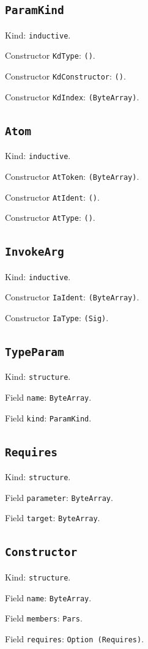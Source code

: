 \documentclass[11pt]{article}
\begin{document}
\subsection*{\texttt{ParamKind}}
\noindent Kind: \texttt{inductive}.\par
\noindent Constructor \texttt{KdType}: \texttt{()}.\par
\noindent Constructor \texttt{KdConstructor}: \texttt{()}.\par
\noindent Constructor \texttt{KdIndex}: \texttt{(ByteArray)}.\par
\subsection*{\texttt{Atom}}
\noindent Kind: \texttt{inductive}.\par
\noindent Constructor \texttt{AtToken}: \texttt{(ByteArray)}.\par
\noindent Constructor \texttt{AtIdent}: \texttt{()}.\par
\noindent Constructor \texttt{AtType}: \texttt{()}.\par
\subsection*{\texttt{InvokeArg}}
\noindent Kind: \texttt{inductive}.\par
\noindent Constructor \texttt{IaIdent}: \texttt{(ByteArray)}.\par
\noindent Constructor \texttt{IaType}: \texttt{(Sig)}.\par
\subsection*{\texttt{TypeParam}}
\noindent Kind: \texttt{structure}.\par
\noindent Field \texttt{name}: \texttt{ByteArray}.\par
\noindent Field \texttt{kind}: \texttt{ParamKind}.\par
\subsection*{\texttt{Requires}}
\noindent Kind: \texttt{structure}.\par
\noindent Field \texttt{parameter}: \texttt{ByteArray}.\par
\noindent Field \texttt{target}: \texttt{ByteArray}.\par
\subsection*{\texttt{Constructor}}
\noindent Kind: \texttt{structure}.\par
\noindent Field \texttt{name}: \texttt{ByteArray}.\par
\noindent Field \texttt{members}: \texttt{Pars}.\par
\noindent Field \texttt{requires}: \texttt{Option (Requires)}.\par
\end{document}
